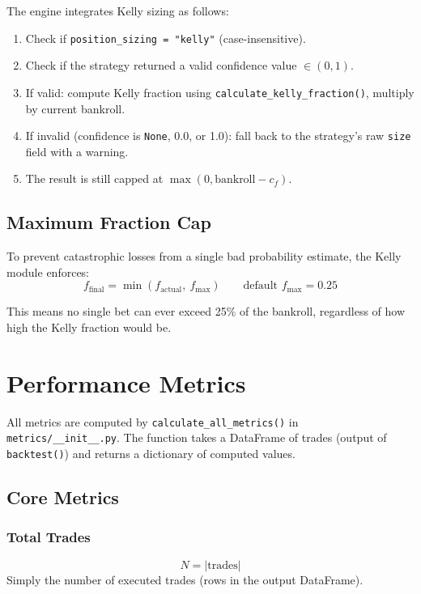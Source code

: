 \documentclass[12pt,a4paper]{report}
\theoremstyle{definition}
\newcommand{\code}[1]{\texttt{#1}}
\newcommand{\file}[1]{\texttt{#1}}
\newcommand{\func}[1]{\texttt{#1()}}
\begin{document}
The engine integrates Kelly sizing as follows:

\begin{enumerate}
    \item Check if \code{position\_sizing = "kelly"} (case-insensitive).
    \item Check if the strategy returned a valid confidence value $\in (0, 1)$.
    \item If valid: compute Kelly fraction using \func{calculate\_kelly\_fraction}, multiply by current bankroll.
    \item If invalid (confidence is \code{None}, 0.0, or 1.0): fall back to the strategy's raw \code{size} field with a warning.
    \item The result is still capped at $\max(0, \text{bankroll} - c_f)$.
\end{enumerate}

\section{Maximum Fraction Cap}

To prevent catastrophic losses from a single bad probability estimate, the Kelly module enforces:
\begin{equation}
    f_{\text{final}} = \min(f_{\text{actual}},\ f_{\text{max}}) \qquad \text{default } f_{\text{max}} = 0.25
\end{equation}

This means no single bet can ever exceed 25\% of the bankroll, regardless of how high the Kelly fraction would be.


\chapter{Performance Metrics}
\label{ch:metrics}

All metrics are computed by \func{calculate\_all\_metrics} in \file{metrics/\_\_init\_\_.py}. The function takes a DataFrame of trades (output of \func{backtest}) and returns a dictionary of computed values.

\section{Core Metrics}

\subsection{Total Trades}
\begin{equation}
    N = |\text{trades}|
\end{equation}
Simply the number of executed trades (rows in the output DataFrame).
\end{document}
